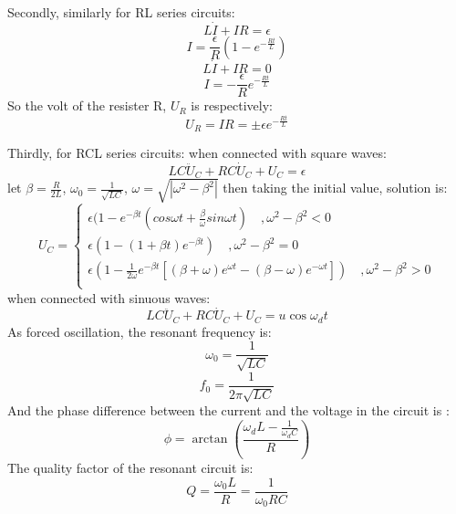 \documentclass[12pt, a4paper, oneside]{article}
\begin{document}
Secondly, similarly for RL series circuits:
\begin{equation}
  L \dot I + IR = \epsilon
\end{equation}
\begin{equation}
  I = \frac{\epsilon}{R}(1-e^{-\frac{Rt}{L}})
\end{equation}
\begin{equation}
  L \dot I + IR = 0
\end{equation}
\begin{equation}
  I = -\frac{\epsilon}{R}e^{-\frac{Rt}{L}}
\end{equation}
So the volt of the resister R, $U_R$ is respectively:
\begin{equation}
  U_R =IR=\pm \epsilon e^{-\frac{Rt}{L}}
\end{equation}

Thirdly, for RCL series circuits: when connected with square waves:
\begin{equation}
  LC \ddot U_C + RC\dot U_C +  U_C = \epsilon
\end{equation}
let $\beta = \frac{R}{2L}$, $\omega_0 = \frac{1}{\sqrt{LC}}$, $\omega = \sqrt{|\omega^2-\beta^2|}$ then taking the initial value, solution is:
\begin{equation}
U_C=\begin{cases}
	\epsilon (1-e^{-\beta t}(cos{\omega t} + \frac{\beta}{\omega}sin{\omega t}) \quad  , \omega^2-\beta^2<0\\
	\epsilon (1-(1+\beta t)e^{-\beta t}) \quad , \omega^2-\beta^2=0\\
	\epsilon (1-\frac{1}{2\omega}e^{-\beta t}[(\beta+\omega)e^{\omega t}-(\beta-\omega)e^{-\omega t}]) \quad , \omega^2-\beta^2>0\\
	\end{cases}
\end{equation}
when connected with sinuous waves:
\begin{equation}
  LC \ddot U_C + RC\dot U_C +  U_C = u\cos{\omega_d t}
\end{equation}
As forced oscillation, the resonant frequency is:
\begin{equation}
  \omega_0 = \frac{1}{\sqrt{LC}}
\end{equation}
\begin{equation}
  f_0 = \frac{1}{2\pi\sqrt{LC}}
\end{equation}
And the phase difference between the current and the voltage in the circuit is :
\begin{equation}
  \phi = \arctan{(\frac{\omega_d L-\frac{1}{\omega_d C}}{R})}
\end{equation}
The quality factor of the resonant circuit is:
\begin{equation}
  Q=\frac{\omega_0L}{R}=\frac{1}{\omega_0RC}
\end{equation}
\end{document}
